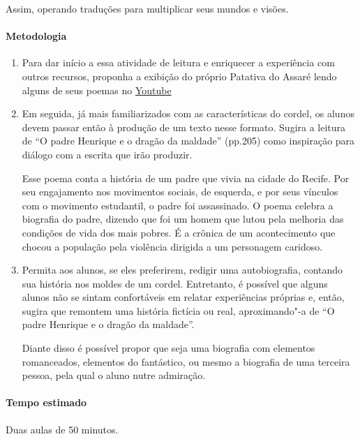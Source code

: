 \documentclass[12pt]{extarticle}
\begin{document}
Assim, operando traduções para multiplicar seus mundos e visões.

\paragraph{Metodologia}

\begin{enumerate}
\item
Para dar início a essa atividade de leitura e enriquecer a experiência com outros recursos, 
proponha a exibição do próprio Patativa do Assaré lendo alguns
de seus poemas no \href{https://www.youtube.com/watch?v=RTEfYnMNNpc&ab_channel=IrandiHolanda}{Youtube}

\item
Em seguida, já mais familiarizados com as características do cordel, os
alunos devem passar então à produção de um texto nesse formato. Sugira a 
leitura de ``O padre Henrique e o dragão da maldade'' (pp.205) como 
inspiração para diálogo com a escrita que irão produzir. 

Esse poema conta a história de um padre que vivia na cidade
do Recife. Por seu engajamento nos movimentos sociais, de
esquerda, e por seus vínculos com o movimento estudantil,
o padre foi assassinado. O poema celebra a biografia do
padre, dizendo que foi um homem que lutou pela melhoria
das condições de vida dos mais pobres. É a crônica de
um acontecimento que chocou a população pela violência
dirigida a um personagem caridoso.

\item
Permita aos alunos, se eles preferirem, redigir uma autobiografia, contando
sua história nos moldes de um cordel. Entretanto, é possível que alguns
alunos não se sintam confortáveis em relatar experiências próprias e, então,
sugira que remontem uma história fictícia ou real, aproximando"-a de 
``O padre Henrique e o dragão da maldade''.

Diante disso é possível propor que seja uma biografia com elementos
romanceados, elementos do fantástico, ou mesmo a biografia de uma
terceira pessoa, pela qual o aluno nutre admiração. 

\end{enumerate}

\paragraph{Tempo estimado} Duas aulas de 50 minutos. 

\end{document}
